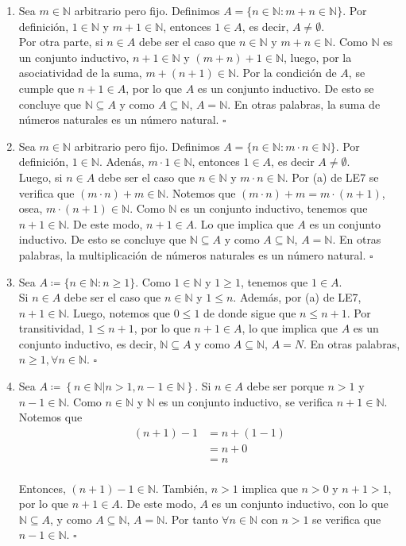 \documentclass[11pt]{article}
\newcommand{\N}{\mathbb{N}}
\def\defined #1{\coloneqq \left\{#1\right\}}
\begin{document}
\begin{enumerate}[label=\alph*)]
    \item Sea $m\in \N$ arbitrario pero fijo. Definimos $A=\{ n\in \N : m+n \in \N \}$. Por definición, $1\in \N$ y $m+1\in \N$, entonces $1\in A$, es decir, $A\neq \emptyset$. \\[5pt] Por otra parte, si $n\in A$ debe ser el caso que $n\in \N$ y $m+n\in \N$. Como $\N$ es un conjunto inductivo, $n+1 \in \N$ y $(m+n)+1 \in \N$, luego, por la asociatividad de la suma, $m+(n+1)\in \N$. Por la condición de $A$, se cumple que $n+1\in A$, por lo que $A$ es un conjunto inductivo. De esto se concluye que $\N\subseteq A$ y como $A\subseteq \N$, $A=\N$. En otras palabras, la suma de números naturales es un número natural. \mbox{}\hfill $\square$
    
    \item Sea $m\in \N$ arbitrario pero fijo. Definimos $A=\{n\in \N: m\cdot n \in \N\}$. Por definición, $1 \in \N$. Adenás, $m\cdot 1 \in \N$, entonces $1 \in A$, es decir $A \neq \emptyset$.\\[5pt] 
    Luego, si $n \in A$ debe ser el caso que $n\in \N$ y $m \cdot n \in \N$. Por (a) de LE7 se verifica que $(m \cdot n) + m \in \N$. Notemos que $(m \cdot n) + m=m \cdot (n+1)$, osea, $m \cdot (n+1) \in \N$. Como $\N$ es un conjunto inductivo, tenemos que $n+1\in \N$. De este modo, $n+1\in A$. Lo que implica que $A$ es un conjunto inductivo. De esto se concluye que $\N \subseteq A$ y como $A\subseteq \N$, $A=\N$. En otras palabras, la multiplicación de números naturales es un número natural. \mbox{}\hfill $\square$

    \item Sea $A\coloneqq \{n\in \N: n\geq 1\}$. Como $1\in \N$ y $1\geq 1$, tenemos que $1\in A$.\\[5pt]
    Si $n\in A$ debe ser el caso que $n\in \N$ y $1\leq n$. Además, por (a) de LE7, $n+1\in \N$. Luego, notemos que $0 \leq 1$ de donde sigue que $n \leq n+1$. Por transitividad, $1\leq n+1$, por lo que $n+1\in A$, lo que implica que $A$ es un conjunto inductivo, es decir, $\N\subseteq A$ y como $A\subseteq \N$, $A=N$. En otras palabras, $n\geq 1, \forall n\in\N$. \mbox{}\hfill $\square$

    \item Sea $A \defined{n\in \N | n>1, n-1\in \N}$. Si $n\in A$ debe ser porque $n>1$ y $n-1\in \N$. Como $n\in \N$ y $\N$ es un conjunto inductivo, se verifica $n+1\in\N$. Notemos que \begin{align*}
        (n+1)-1 &= n+(1-1) \\
        &= n+ 0\\
        &= n
    \end{align*}\\
    Entonces, $(n+1)-1\in \N$. También, $n>1$ implica que $n>0$ y $n+1>1$, por lo que $n+1\in A$. De este modo, $A$ es un conjunto inductivo, con lo que $\N \subseteq A$, y como $A\subseteq \N$, $A=\N$. Por tanto $\forall n\in \N$ con $n>1$ se verifica que $n-1\in \N$. \mbox{}\hfill $\square$


\end{enumerate}
\end{document}
